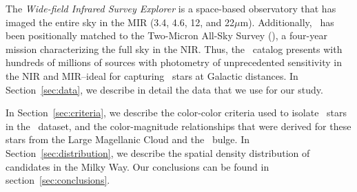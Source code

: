 The \emph{Wide-field Infrared Survey Explorer} \citep[\wise, ][]{2010AJ....140.1868W, 2012wise.rept....1C} is a space-based observatory that has imaged the entire sky in the MIR (3.4, 4.6, 12, and 22$\mu$m). Additionally, \wise\, has been positionally matched to the Two-Micron All-Sky Survey (\twomass), a four-year mission characterizing the full sky in the NIR. Thus, the \wise\, catalog presents with hundreds of millions of sources with photometry of unprecedented sensitivity in the NIR and MIR--ideal for capturing \agb\, stars at Galactic distances. In Section~\ref{sec:data}, we describe in detail the data that we use for our study. 

In Section~\ref{sec:criteria}, we describe the color-color criteria used to isolate \agb\, stars in the \wise\, dataset, and the color-magnitude relationships that were derived for these stars from the Large Magellanic Cloud and the \mw\, bulge.
In Section~\ref{sec:distribution}, we describe the spatial density distribution of \agb\, candidates in the Milky Way.
Our conclusions can be found in section~\ref{sec:conclusions}.
